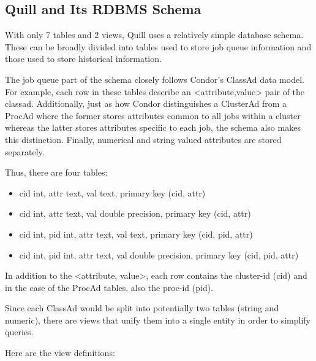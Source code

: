 \subsection{\label{sec:Quill-Schema}Quill and Its RDBMS Schema}

With only 7 tables and 2 views, Quill uses a relatively simple database
schema.  These can be broadly divided into tables used to store job
queue information and those used to store historical information.

The job queue part of the schema closely follows Condor's ClassAd data
model. For example, each row in these tables describe an <attribute,value>
pair of the classad.  Additionally, just as how Condor distinguishes a
ClusterAd from a ProcAd where the former stores attributes common to all
jobs within a cluster whereas the latter stores attributes specific to
each job, the schema also makes this distinction.  Finally, numerical
and string valued attributes are stored separately.

Thus, there are four tables:

\begin{itemize}

\item 
		{cid int, 
		attr text, 
		val text, 
		primary key (cid, attr)}

\item 
		{cid int, 
		attr text, 
		val double precision, 
		primary key (cid, attr)}

\item 
		{cid int, 
		pid int, 
		attr text, 
		val text, 
		primary key (cid, pid, attr)}

\item 
		{cid int, 
		pid int, 
		attr text, 
		val double precision,
		primary key (cid, pid, attr)}

\end{itemize}

In addition to the <attribute, value>, each row contains the cluster-id
(cid) and in the case of the ProcAd tables, also the proc-id (pid).

Since each ClassAd would be split into potentially two tables (string
and numeric), there are views that unify them into a single entity in
order to simplify queries.

Here are the view definitions:

